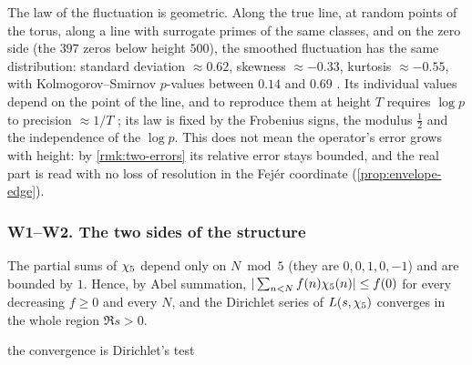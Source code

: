 The law of the fluctuation is geometric.  Along the true line, at random points of the
torus, along a line with surrogate primes of the same classes, and on the zero side (the
$397$ zeros below height $500$), the smoothed fluctuation has the same distribution:
standard deviation $\approx0.62$, skewness $\approx-0.33$, kurtosis $\approx-0.55$, with
Kolmogorov--Smirnov $p$-values between $0.14$ and $0.69$ .  Its
individual values depend on the point of the line, and to reproduce them at height $T$
requires $\log p$ to precision $\approx1/T$ ; its law is fixed by the
Frobenius signs, the modulus $\tfrac12$ and the independence of the $\log p$.  This does not mean the operator's error grows with height: by
\cref{rmk:two-errors} its relative error stays bounded, and the real part
is read with no loss of resolution in the Fej\'er coordinate (\cref{prop:envelope-edge}).

\subsubsection{W1--W2. The two sides of the structure}\label{ssec:two-sides}

\begin{proposition}\label{prop:additive-side}
The partial sums of $\chi_5$ depend only on $N\bmod5$ (they are $0,0,1,0,-1$) and are bounded
by $1$.  Hence, by Abel summation, $|\sum_{n<N}f(n)\chi_5(n)|\le f(0)$ for every decreasing
$f\ge0$ and every $N$, and the Dirichlet series of $L(s,\chi_5)$ converges in the whole region
$\Re s>0$.


the convergence is Dirichlet's test
\end{proposition}

